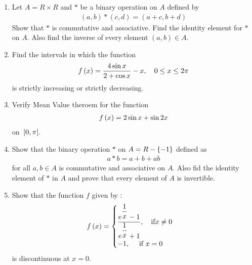 \begin{enumerate}
	\item Let $A = R \times R$ and $*$ be a binary operation on $A$ defined by
	\begin{align*}
		(a, b) * (c, d) = (a + c, b + d)
	\end{align*}
	Show that $*$ is commutative and associative. Find the identity element for $*$
on $A$. Also find the inverse of every element $(a, b) \in A$.
\item Find the intervals in which the function
          \begin{align*}
              f\left(x\right)= \dfrac{4\sin x}{2+\cos x} -x,\quad 0 \leq x \leq 2\pi
          \end{align*}
          is strictly increasing or strictly decreasing.
    \item Verify Mean Value theroem for the function
          \begin{align*}
              f\left(x\right)= 2\sin x + \sin 2x
          \end{align*}
          on ${}\left[0,\pi\right]$.
    \item Show that the binary operation $*$ on $ A=R -\left\{-1\right\}$ defined as
          \begin{align*}
              a*b= a+b+ab
          \end{align*}
          for all $a,b \in A$ is commutative and associative on $A$. Also fid the identity element of $*$ in $A$ and prove that every element of $A$ is invertible.\item Show that the function $f$ given by :
          \begin{align*}
              f\left(x\right) = \begin{cases}
                              \dfrac{e^{\dfrac{1}{x}}-1}{e^{\dfrac{1}{x}}+1} ,\quad \text{if} x\neq 0 \\
                              -1,\quad \text{ if } x=0
                          \end{cases}
          \end{align*}
          is discontinuous at $x=0$.
\end{enumerate}
